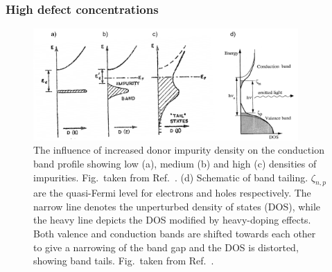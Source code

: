 \documentclass[11pt, twoside]{report}
\begin{document}
\subsubsection{High defect concentrations}

\begin{figure}[h!]
  \centering
    \includegraphics[width=0.9\textwidth]{figures/bs2+pankove.png}
    \caption[The influence of increased donor impurity density on the conduction band profile showing low (a), medium (b) and high (c) densities of impurities. (d) Schematic of band tailing. $\zeta_{n,p}$ are the quasi-Fermi level for electrons and holes respectively. The narrow line denotes the unperturbed density of states (DOS), while the heavy line depicts the DOS modified by heavy-doping effects. Both valence and conduction bands are shifted towards each other to give a narrowing of the band gap and the DOS is distorted, showing band tails.]{The influence of increased donor impurity density on the conduction band profile showing low (a), medium (b) and high (c) densities of impurities. Fig.~taken from Ref.~. (d) Schematic of band tailing. $\zeta_{n,p}$ are the quasi-Fermi level for electrons and holes respectively. The narrow line denotes the unperturbed density of states (DOS), while the heavy line depicts the DOS modified by heavy-doping effects. Both valence and conduction bands are shifted towards each other to give a narrowing of the band gap and the DOS is distorted, showing band tails. Fig.~taken from Ref.~.}
  \label{bs2}
\end{figure}
\end{document}
